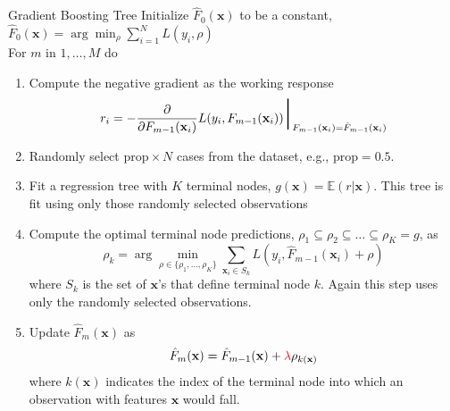 \documentclass{beamer}
\begin{document}
\begin{frame}{Gradient Boosting Tree}
\footnotesize
Initialize $\hat F_0(\mathbf{x})$ to be a constant, $\hat F_0(\mathbf{x}) = \arg \min_{\rho} \sum_{i=1}^N L(y_i,\rho)$ \\
For $m$ in $1,\ldots,M$ do
\begin{enumerate}\footnotesize
\item Compute the negative gradient as the working response
    \begin{equation}
    r_i = -\frac{\partial}{\partial F_{m-1}(\mathbf{x}_i)} L(y_i,F_{m-1}(\mathbf{x}_i)) \mbox{\Huge $|$}_{F_{m-1}(\mathbf{x}_i)=\hat F_{m-1}(\mathbf{x}_i)}
    \end{equation}
\item Randomly select $\mathrm{prop}\times N$ cases from the dataset, e.g., $\mathrm{prop} = 0.5$.
\item Fit a regression tree with $K$ terminal nodes, $g(\mathbf{x})=\mathbb{E}(r|\mathbf{x})$. This tree is fit using only those randomly selected observations
\item Compute the optimal terminal node predictions, $\rho_1\subseteq \rho_2 \subseteq \dots \subseteq \rho_K=g$, as
    \begin{equation}
    \rho_k = \arg \min_{\rho\in \{\rho_1,\ldots,\rho_K\}} \sum_{\mathbf{x}_i\in S_k} L(y_i,\hat F_{m-1}(\mathbf{x}_i)+\rho)
    \end{equation}
where $S_k$ is the set of $\mathbf{x}$'s that define terminal node $k$. Again this step uses only the randomly selected observations.
\item Update $\hat F_{m}(\mathbf{x})$ as
    \begin{equation}
    \hat F_m(\mathbf{x}) = \hat F_{m-1}(\mathbf{x}) + {\color{red}{\lambda}} \rho_{k(\mathbf{x})}
    \end{equation}
where $k(\mathbf{x})$ indicates the index of the terminal node into which an observation with features $\mathbf{x}$ would fall.
\end{enumerate}
\end{frame}
\end{document}
